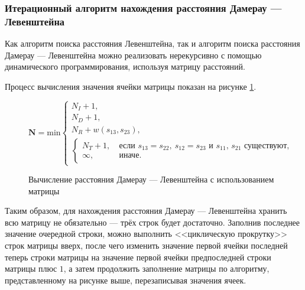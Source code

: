 \subsubsection{Итерационный алгоритм нахождения расстояния Дамерау --- Левенштейна}

Как алгоритм поиска расстояния Левенштейна, так и алгоритм поиска расстояния Дамерау --- Левенштейна можно реализовать нерекурсивно с помощью динамического программирования, используя матрицу расстояний.

Процесс вычисления значения ячейки матрицы показан на рисунке \ref{fig:dlmat}.

\begin{figure}[H]
    \begin{center}

        \( \boldsymbol{N} =
        \mathrm{min} \begin{cases}
    N_I + 1, \\
    N_D + 1, \\
    N_R + w(s_{13}, s_{23}), \\
            \begin{cases}
                N_T + 1,\ &\text{если $s_{13} = s_{22},\ s_{12} = s_{23}$ и $s_{11}$, $s_{21}$ существуют}, \\
                \infty,\ &\text{иначе}.
            \end{cases}
\end{cases} \)
    \end{center}
    \caption{Вычисление расстояния Дамерау --- Левенштейна с использованием матрицы}
    \label{fig:dlmat}
\end{figure}

Таким образом, для нахождения расстояния Дамерау --- Левенштейна хранить всю матрицу не обязательно --- трёх строк будет достаточно.
Заполнив последнее значение очередной строки, можно выполнить <<циклическую прокрутку>> строк матрицы вверх, после чего изменить значение первой ячейки последней теперь строки матрицы на значение первой ячейки предпоследней строки матрицы плюс $1$, а затем продолжить заполнение матрицы по алгоритму, представленному на рисунке выше, перезаписывая значения ячеек.
